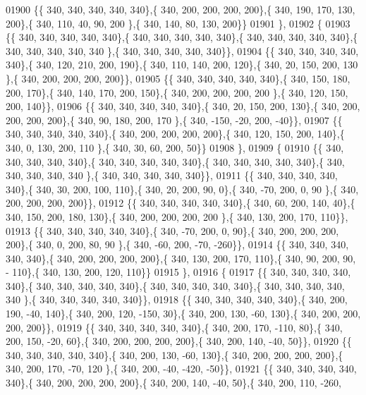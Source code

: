 \begin{DoxyCode}
01900 \{\{ 340, 340, 340, 340, 340\},\{ 340, 200, 200, 200, 200\},\{ 340, 190, 170, 130, 200\},\{ 340, 110,  40,  90, 200
      \},\{ 340, 140,  80, 130, 200\}\}
01901 \},
01902 \{
01903 \{\{ 340, 340, 340, 340, 340\},\{ 340, 340, 340, 340, 340\},\{ 340, 340, 340, 340, 340\},\{ 340, 340, 340, 340, 340
      \},\{ 340, 340, 340, 340, 340\}\},
01904 \{\{ 340, 340, 340, 340, 340\},\{ 340, 120, 210, 200, 190\},\{ 340, 110, 140, 200, 120\},\{ 340,  20, 150, 200, 130
      \},\{ 340, 200, 200, 200, 200\}\},
01905 \{\{ 340, 340, 340, 340, 340\},\{ 340, 150, 180, 200, 170\},\{ 340, 140, 170, 200, 150\},\{ 340, 200, 200, 200, 200
      \},\{ 340, 120, 150, 200, 140\}\},
01906 \{\{ 340, 340, 340, 340, 340\},\{ 340,  20, 150, 200, 130\},\{ 340, 200, 200, 200, 200\},\{ 340,  90, 180, 200, 170
      \},\{ 340, -150, -20, 200, -40\}\},
01907 \{\{ 340, 340, 340, 340, 340\},\{ 340, 200, 200, 200, 200\},\{ 340, 120, 150, 200, 140\},\{ 340,   0, 130, 200, 110
      \},\{ 340,  30,  60, 200,  50\}\}
01908 \},
01909 \{
01910 \{\{ 340, 340, 340, 340, 340\},\{ 340, 340, 340, 340, 340\},\{ 340, 340, 340, 340, 340\},\{ 340, 340, 340, 340, 340
      \},\{ 340, 340, 340, 340, 340\}\},
01911 \{\{ 340, 340, 340, 340, 340\},\{ 340,  30, 200, 100, 110\},\{ 340,  20, 200,  90,   0\},\{ 340, -70, 200,   0,  90
      \},\{ 340, 200, 200, 200, 200\}\},
01912 \{\{ 340, 340, 340, 340, 340\},\{ 340,  60, 200, 140,  40\},\{ 340, 150, 200, 180, 130\},\{ 340, 200, 200, 200, 200
      \},\{ 340, 130, 200, 170, 110\}\},
01913 \{\{ 340, 340, 340, 340, 340\},\{ 340, -70, 200,   0,  90\},\{ 340, 200, 200, 200, 200\},\{ 340,   0, 200,  80,  90
      \},\{ 340, -60, 200, -70, -260\}\},
01914 \{\{ 340, 340, 340, 340, 340\},\{ 340, 200, 200, 200, 200\},\{ 340, 130, 200, 170, 110\},\{ 340,  90, 200,  90, -
      110\},\{ 340, 130, 200, 120, 110\}\}
01915 \},
01916 \{
01917 \{\{ 340, 340, 340, 340, 340\},\{ 340, 340, 340, 340, 340\},\{ 340, 340, 340, 340, 340\},\{ 340, 340, 340, 340, 340
      \},\{ 340, 340, 340, 340, 340\}\},
01918 \{\{ 340, 340, 340, 340, 340\},\{ 340, 200, 190, -40, 140\},\{ 340, 200, 120, -150,  30\},\{ 340, 200, 130, -60, 
      130\},\{ 340, 200, 200, 200, 200\}\},
01919 \{\{ 340, 340, 340, 340, 340\},\{ 340, 200, 170, -110,  80\},\{ 340, 200, 150, -20,  60\},\{ 340, 200, 200, 200, 
      200\},\{ 340, 200, 140, -40,  50\}\},
01920 \{\{ 340, 340, 340, 340, 340\},\{ 340, 200, 130, -60, 130\},\{ 340, 200, 200, 200, 200\},\{ 340, 200, 170, -70, 120
      \},\{ 340, 200, -40, -420, -50\}\},
01921 \{\{ 340, 340, 340, 340, 340\},\{ 340, 200, 200, 200, 200\},\{ 340, 200, 140, -40,  50\},\{ 340, 200, 110, -260, 

\end{DoxyCode}

